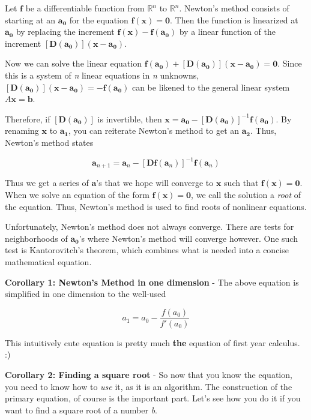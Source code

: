 \documentclass{article}
\begin{document}
\newcommand{\fvec}{{\mathbf{f}}}
\newcommand{\xpt}{\mathbf{x}}
\newcommand{\dfa}{[\mathbf{D}(\mathbf{a_0})]}
\newcommand{\ao}{\mathbf{a_0}}
\newcommand{\ovec}{\mathbf{0}}
\newcommand{\xvec}{\mathbf{x}}
\newcommand{\bvec}{\mathbf{b}}

Let $\fvec$ be a differentiable function from $\mathbb{R}^n$ to $\mathbb{R}^n$.
Newton's method consists of starting at an $\ao$ for the equation $\fvec(\xpt)=\ovec$. Then the function is linearized at $\ao$ by replacing the increment $\fvec(\xpt)-\fvec(\ao)$ by a linear function of the increment $\dfa(\xpt-\ao)$.

Now we can solve the linear equation $\fvec(\ao)+\dfa(\xpt-\ao)=\ovec$.
Since this is a system of \emph{n} linear equations in \emph{n} unknowns, 
$\dfa(\xpt-\ao) = -\fvec(\ao)$ can be likened to the general linear system  $A\xvec=\bvec$.  

Therefore, if $\dfa$ is invertible, then $\xpt = \ao-\dfa^{-1}\fvec(\ao)$.
By renaming $\xpt$ to $\mathbf{a_1}$, you can reiterate Newton's method to get an $\mathbf{a_2}$. Thus, Newton's method states

$$\mathbf{a}_{n+1} = \mathbf{a}_n - [\mathbf{D}\fvec(\mathbf{a}_n)]^{-1}\fvec(\mathbf{a}_n)$$

Thus we get a series of $\mathbf{a}$'s that we hope will converge to $\xpt$ such that $\fvec(\xpt)=\ovec$.  When we solve an equation of the form $\fvec(\xpt) = \ovec$, we call the solution a \emph{root} of the equation. Thus, Newton's method is used to find roots of nonlinear equations.

Unfortunately, Newton's method does not always converge. There are tests for 
neighborhoods of $\ao$'s where Newton's method will converge however. One such test is Kantorovitch's theorem, which combines what is needed into a concise mathematical equation.

\textbf{Corollary 1: Newton's Method in one dimension} - The above equation is simplified in one dimension to the well-used 

$$a_1 = a_0 - \frac{f(a_0)}{f'(a_0)}$$ 

This intuitively cute equation is pretty much \textbf{the} equation of first year calculus. :)

\textbf{Corollary 2: Finding a square root} - So now that you know the equation, 
you need to know how to \emph{use} it, as it is an algorithm. The construction of the primary equation, of course is the important part. Let's see how you do it if you want to find a square root of a number \emph{b}.
\end{document}
